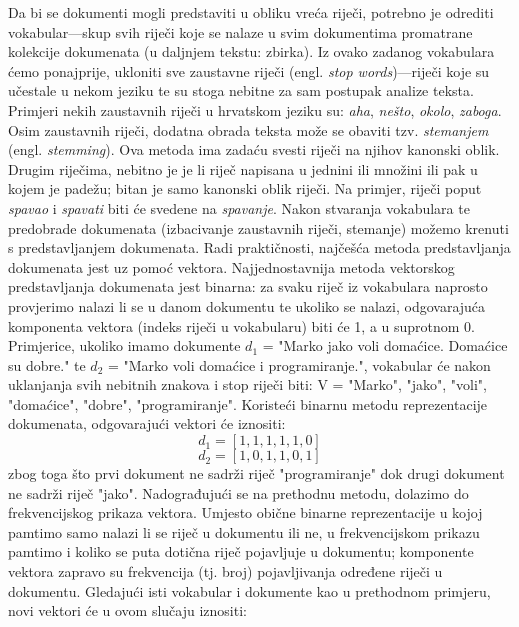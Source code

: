 \documentclass[times, utf8, zavrsni]{fer}
\begin{document}
Da bi se dokumenti mogli predstaviti u obliku vreća riječi, potrebno je odrediti vokabular—skup svih riječi koje se nalaze u svim dokumentima promatrane kolekcije dokumenata (u daljnjem tekstu: zbirka). Iz ovako zadanog vokabulara ćemo ponajprije, ukloniti sve zaustavne riječi (engl. \textit{stop words})—riječi koje su učestale u nekom jeziku te su stoga nebitne za sam postupak analize teksta. Primjeri nekih zaustavnih riječi u hrvatskom jeziku su: \textit{aha}, \textit{nešto}, \textit{okolo}, \textit{zaboga}. Osim zaustavnih riječi, dodatna obrada teksta može se obaviti tzv. \textit{stemanjem} (engl. \textit{stemming}). Ova metoda ima zadaću svesti riječi na njihov kanonski oblik. Drugim riječima, nebitno je je li riječ napisana u jednini ili množini ili pak u kojem je padežu; bitan je samo kanonski oblik riječi. Na primjer, riječi poput \textit{spavao} i \textit{spavati} biti će svedene na \textit{spavanje}.
Nakon stvaranja vokabulara te predobrade dokumenata (izbacivanje zaustavnih riječi, stemanje) možemo krenuti s predstavljanjem dokumenata. Radi praktičnosti, najčešća metoda predstavljanja dokumenata jest uz pomoć vektora.
Najjednostavnija metoda vektorskog predstavljanja dokumenata jest binarna: za svaku riječ iz vokabulara naprosto provjerimo nalazi li se u danom dokumentu te ukoliko se nalazi, odgovarajuća komponenta vektora (indeks riječi u vokabularu) biti će 1, a u suprotnom 0. Primjerice, ukoliko imamo dokumente $d_{1}$ = "Marko jako voli domaćice. Domaćice su dobre." te $d_{2}$ = "Marko voli domaćice i programiranje.", vokabular će nakon uklanjanja svih nebitnih znakova i stop riječi biti: V = {"Marko", "jako", "voli", "domaćice", "dobre", "programiranje"}. Koristeći binarnu metodu reprezentacije dokumenata, odgovarajući vektori će iznositi:
\begin{equation}
{{d_{1}}=[1, 1, 1, 1, 1, 0]}
\end{equation}
\begin{equation}
{{d_{2}}=[1, 0, 1, 1, 0, 1]}
\end{equation}
zbog toga što prvi dokument ne sadrži riječ "programiranje" dok drugi dokument ne sadrži riječ "jako".
Nadograđujući se na prethodnu metodu, dolazimo do frekvencijskog prikaza vektora. Umjesto obične binarne reprezentacije u kojoj pamtimo samo nalazi li se riječ u dokumentu ili ne, u frekvencijskom prikazu pamtimo i koliko se puta dotična riječ pojavljuje u dokumentu; komponente vektora zapravo su frekvencija (tj. broj) pojavljivanja određene riječi u dokumentu. Gledajući isti vokabular i dokumente kao u prethodnom primjeru, novi vektori će u ovom slučaju iznositi:
\end{document}
